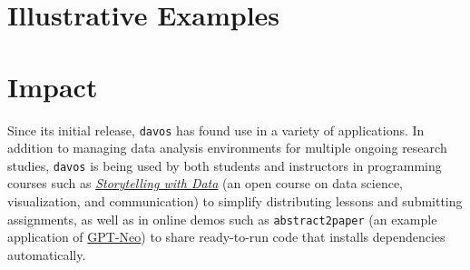\documentclass[preprint,12pt, a4paper]{elsarticle}
\newcommand{\comment}[1]{}
\begin{document}
\section{Illustrative Examples}



\section{Impact}
\comment{
- emphasize research domain-independent application (Journal's goals/values page says they prioritize this in submissions)
- applicability not limited to research
    - regression (?) testing
    - ***^^not sure this should be included -- hurts framing of davos as "research software"***
- makes writing and running publicly available reproducible code more accessible (lowers required software comfort/familiarity level \& computing resources vs. installing docker/singularity/conda)
    - also removes these requirements from other scenarios, e.g., easier for new/less experienced students/RAs to get involved with analyses
- mention something about not having to teach environment management to teach day 1 python lesson, or spend hours debugging conda installation in order to share tutorial or demo with students
    - e.g., "researchers who teach \_\_\_ may be familiar with the experience of running a lesson or workshop that requires students to use Docker (or similar...) to run their code, only to spend the majority of class time debugging students' computing environments rather than teaching the lesson itself."
}

Since its initial release, \texttt{davos} has found use in a variety of applications.
In addition to managing data analysis environments for multiple ongoing research studies, \texttt{davos} is being used by both students and instructors in programming courses such as \href{https://github.com/ContextLab/storytelling-with-data}{\textit{Storytelling with Data}} \cite{Mann21b} (an open course on data science, visualization, and communication) to simplify distributing lessons and submitting assignments, as well as in online demos such as {\texttt{abstract2paper}} \cite{Mann21a} (an example application of \href{https://github.com/EleutherAI/gpt-neo}{GPT-Neo}) to share ready-to-run code that installs dependencies automatically.
\end{document}

